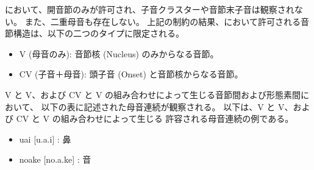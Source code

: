 \langname において、開音節のみが許可され、子音クラスターや音節末子音は観察されない。
また、二重母音も存在しない。
上記の制約の結果、\langname において許可される音節構造は、以下の二つのタイプに限定される。

\begin{itemize}
    \item {V (母音のみ)}: 音節核 (Nucleus) のみからなる音節。
    \item {CV (子音＋母音)}: 頭子音 (Onset) と音節核からなる音節。
\end{itemize}

{V} と {V}、および {CV} と {V} の組み合わせによって生じる音節間および形態素間において、
以下の表に記述された母音連続が観察される。
以下は、{V} と {V}、および {CV} と {V} の組み合わせによって生じる
許容される母音連続の例である。

\begin{itemize}
    \item uai [u.a.i] : 鼻
    \item noake [no.a.ke] : 音
\end{itemize}
